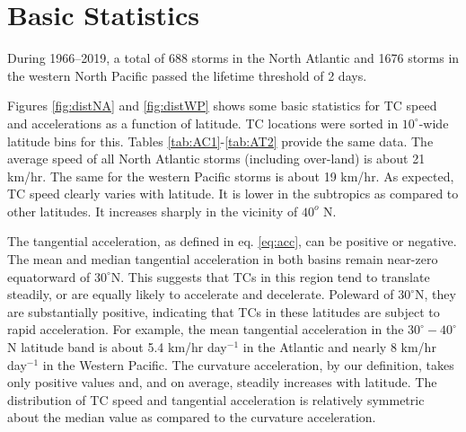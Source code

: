 \documentclass[wcd,manuscript]{copernicus}
\begin{document}


\section{Basic Statistics}

During 1966--2019, a total of 688 storms in the North Atlantic and 1676 storms in the western North Pacific passed the lifetime threshold of 2 days. 



Figures \ref{fig:distNA} and \ref{fig:distWP} shows some basic statistics for TC speed and accelerations as a function of latitude. TC locations were sorted in $10^\circ$-wide latitude bins for this. Tables \ref{tab:AC1}-\ref{tab:AT2} provide the same data. The average speed of all North Atlantic storms (including over-land) is about 21 km/hr. The same for the western Pacific storms is about 19 km/hr. As expected, TC speed clearly varies with latitude. It is lower in the subtropics as compared to other latitudes. It increases sharply in the vicinity of $40^{o}$ N. 


The tangential acceleration, as defined in eq. \ref{eq:acc}, can be positive or negative. The mean and median tangential acceleration in both basins remain near-zero equatorward of $30^\circ$N. This suggests that TCs in this region tend to translate steadily, or are equally likely to accelerate and decelerate. Poleward of $30^\circ$N, they are substantially positive, indicating that TCs in these latitudes are subject to rapid acceleration. For example, the mean tangential acceleration in the $30^\circ-40^\circ$N latitude band is about 5.4  km/hr day$^{-1}$ in the Atlantic and nearly 8  km/hr day$^{-1}$ in the Western Pacific.  The curvature acceleration, by our definition, takes only positive values and, and on average, steadily increases with latitude. The distribution of TC speed and tangential acceleration is relatively symmetric about the median value as compared to the curvature acceleration.

\end{document}
